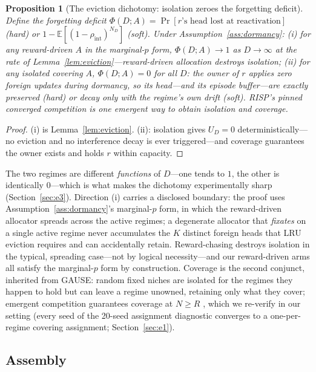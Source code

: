 \documentclass{article}
\newtheorem{proposition}{Proposition}
\newcommand{\E}{\mathbb{E}}
\newcommand{\nm}{\textsc{RISP}}
\begin{document}
\begin{proposition}[The eviction dichotomy: isolation zeroes the
forgetting deficit]
\label{prop:dichotomy}
Define the forgetting deficit $\Phi(D; A) = \Pr[\text{$r$'s head lost at
reactivation}]$ (hard) or $1 - \E[(1-\rho_{\mathrm{int}})^{N_D}]$ (soft).
Under Assumption~\ref{ass:dormancy}: (i) for any reward-driven $A$ in the
marginal-$p$ form, $\Phi(D; A) \to 1$ as $D \to \infty$ at the rate of
Lemma~\ref{lem:eviction}---reward-driven allocation destroys isolation;
(ii) for any \emph{isolated covering} $A$, $\Phi(D; A) = 0$ for all $D$:
the owner of $r$ applies zero foreign updates during dormancy, so its
head---and its episode buffer---are exactly preserved (hard) or decay
only with the regime's own drift (soft). \nm{}'s pinned converged
competition is one emergent way to obtain isolation and coverage.
\end{proposition}

\begin{proof}
(i) is Lemma~\ref{lem:eviction}. (ii): isolation gives $U_D = 0$
deterministically---no eviction and no interference decay is ever
triggered---and coverage guarantees the owner exists and holds $r$
within capacity.
\end{proof}

The two regimes are different \emph{functions} of $D$---one tends to $1$,
the other is identically $0$---which is what makes the dichotomy
experimentally sharp (Section~\ref{sec:e3}). Direction (i) carries a
disclosed boundary: the proof uses Assumption~\ref{ass:dormancy}'s
marginal-$p$ form, in which the reward-driven allocator spreads across
the active regimes; a degenerate allocator that \emph{fixates} on a
single active regime never accumulates the $K$ distinct foreign heads
that LRU eviction requires and can accidentally retain. Reward-chasing
destroys isolation in the typical, spreading case---not by logical
necessity---and our reward-driven arms all satisfy the marginal-$p$ form
by construction. Coverage is the second conjunct, inherited from GAUSE:
random fixed niches are isolated for the regimes they happen to hold but
can leave a regime unowned, retaining only what they cover; emergent
competition guarantees coverage at $N \ge R$ \citep{li2026gause}, which we
re-verify in our setting (every seed of the 20-seed assignment diagnostic
converges to a one-per-regime covering assignment; Section~\ref{sec:e1}).

\subsection{Assembly}
\end{document}
